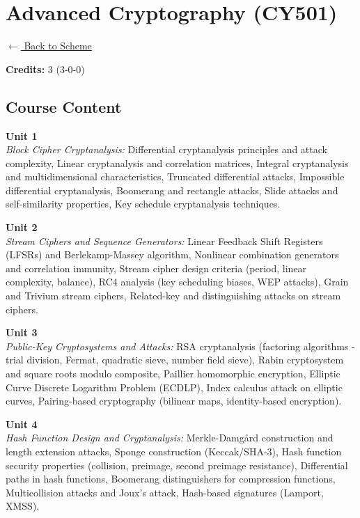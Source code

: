\section*{Advanced Cryptography (CY501)}
\label{major:CS_5}

\noindent \small{\hyperref[main:scheme]{$\leftarrow$ Back to Scheme}} \vspace{0.5cm}

\noindent \textbf{Credits:} 3 (3-0-0)

\subsection*{Course Content}
\noindent\textbf{Unit 1} \\
\textit{Block Cipher Cryptanalysis:} Differential cryptanalysis principles and attack complexity, Linear cryptanalysis and correlation matrices, Integral cryptanalysis and multidimensional characteristics, Truncated differential attacks, Impossible differential cryptanalysis, Boomerang and rectangle attacks, Slide attacks and self-similarity properties, Key schedule cryptanalysis techniques.

\vspace{0.3cm}

\noindent\textbf{Unit 2} \\
\textit{Stream Ciphers and Sequence Generators:} Linear Feedback Shift Registers (LFSRs) and Berlekamp-Massey algorithm, Nonlinear combination generators and correlation immunity, Stream cipher design criteria (period, linear complexity, balance), RC4 analysis (key scheduling biases, WEP attacks), Grain and Trivium stream ciphers, Related-key and distinguishing attacks on stream ciphers.

\vspace{0.3cm}

\noindent\textbf{Unit 3} \\
\textit{Public-Key Cryptosystems and Attacks:} RSA cryptanalysis (factoring algorithms - trial division, Fermat, quadratic sieve, number field sieve), Rabin cryptosystem and square roots modulo composite, Paillier homomorphic encryption, Elliptic Curve Discrete Logarithm Problem (ECDLP), Index calculus attack on elliptic curves, Pairing-based cryptography (bilinear maps, identity-based encryption).

\vspace{0.3cm}

\noindent\textbf{Unit 4} \\
\textit{Hash Function Design and Cryptanalysis:} Merkle-Damgård construction and length extension attacks, Sponge construction (Keccak/SHA-3), Hash function security properties (collision, preimage, second preimage resistance), Differential paths in hash functions, Boomerang distinguishers for compression functions, Multicollision attacks and Joux's attack, Hash-based signatures (Lamport, XMSS).

